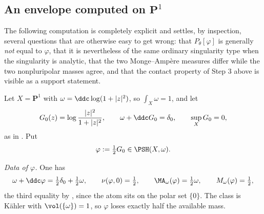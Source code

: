 \subsection{An envelope computed on
\texorpdfstring{$\mathbf P^1$}{P1}}
\label{sec:ch51-p1-envelope}

The following computation is completely explicit and settles, by
inspection, several questions that are otherwise easy to get wrong: that
$P_\theta[\varphi]$ is generally \emph{not} equal to $\varphi$, that
it is nevertheless of the same ordinary singularity type when the
singularity is analytic, that the two Monge--Amp\`ere measures differ
while the two nonpluripolar masses agree, and that the contact property of
Step 3 above is visible as a support statement.

\begin{example}
\label{ex:ch51-p1-envelope}
Let $X=\mathbf P^1$ with $\omega=\ddc\log(1+|z|^2)$, so
$\int_X\omega=1$, and let
\[
 G_0(z)=\log\frac{|z|^2}{1+|z|^2},
 \qquad
 \omega+\ddc G_0=\delta_0,\qquad \sup_XG_0=0,
\]
as in .  Put
\[
 \varphi:=\tfrac12G_0\in\PSH(X,\omega).
\]

\emph{Data of $\varphi$.}  One has
\[
 \omega+\ddc\varphi=\tfrac12\delta_0+\tfrac12\omega,
 \qquad
 \nu(\varphi,0)=\tfrac12,
 \qquad
 \MA_\omega(\varphi)=\tfrac12\omega,
 \qquad
 M_\omega(\varphi)=\tfrac12 ,
\]
the third equality by , since the atom
sits on the polar set $\{0\}$.  The class is K\"ahler with
$\vol(\{\omega\})=1$, so $\varphi$ loses exactly half the available
mass.


\end{example}

